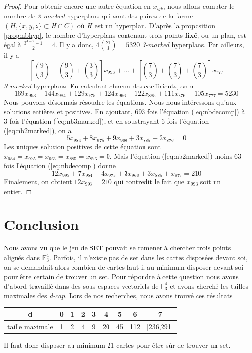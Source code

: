 \documentclass[a4paper,12pt,titlepage]{article}
\theoremstyle{plain}
\newcommand{\Ftrois}[1]{\mathbb{F}^#1_3}
\theoremstyle{definition}
\begin{document}
\begin{proof}
Pour obtenir encore une autre équation en $x_{ijk}$, nous allons compter le nombre de \emph{3-marked} hyperplans qui sont des paires de la forme $(H,\{x,y,z\} \subset H \cap C)$ où $H$ est un hyperplan. D'après la proposition \ref{prop:nbhyp}, le nombre d'hyperplans contenant trois points \textbf{fixé}, ou un plan, est égal à $\frac{3^{4-2}-1}{2} = 4$. Il y a donc, $4 \binom{21}{3} = 5320$ \emph{3-marked} hyperplans. Par ailleurs, il y a 
\[
\left[\binom{9}{3}+\binom{9}{3}+\binom{3}{3}\right]x_{993} + \dots + \left[\binom{7}{3}+\binom{7}{3}+\binom{7}{3}\right]x_{777}
\]
\emph{3-marked} hyperplans. En calculant chacun des coefficients, on a
\begin{equation} \label{eq:nb3marked}
169x_{993} + 144x_{984} + 129x_{975} + 124x_{966} + 122x_{885} + 111x_{876} + 105x_{777} = 5230
\end{equation}
Nous pouvons désormais résoudre les équations. Nous nous intéressons qu'aux solutions entières et positives. En ajoutant, 693 fois l'équation (\ref{eq:nbdecomp}) à 3 fois l'équation (\ref{eq:nb3marked}), et en soustrayant 6 fois l'équation (\ref{eq:nb2marked}), on a
\[
5x_{984} + 8x_{975} + 9x_{966} + 3x_{885} + 2x_{876} = 0
\]
Les uniques solution positives de cette équation sont $x_{984} = x_{975} = x_{966} = x_{885} = x_{876} = 0$. Mais l'équation (\ref{eq:nb2marked}) moins 63 fois l'équation (\ref{eq:nbdecomp}) donne
\[
12x_{993} + 7x_{984} + 4x_{975} + 3x_{966} + 3x_{885} + x_{876} = 210
\]
Finalement, on obtient $12x_{993} = 210$ qui contredit le fait que $x_{993}$ soit un entier.
\end{proof}

\section{Conclusion}
Nous avons vu que le jeu de SET pouvait se ramener à chercher trois points alignés dans $\Ftrois{4}$.
Parfois, il n'existe pas de set dans les cartes disposées devant soi, on se demandait alors combien de cartes faut il au minimum disposer devant soi pour être certain de trouver un set.
Pour répondre à cette question nous avons d'abord travaillé dans des sous-espaces vectoriels de $\Ftrois{4}$
et avons cherché les tailles maximales des \emph{d-cap}. Lors de nos recherches, nous avons trouvé ces résultats

\begin{center}
\begin{tabular}{ c | c c c c c c c c }
d & 0 & 1 & 2 & 3 & 4 & 5 & 6 & 7\\
\hline
taille maximale & 1 & 2 & 4 & 9 & 20 & 45 & 112 & [236,291] \\
\end{tabular}
\end{center}

Il faut donc disposer au minimum 21 cartes pour être sûr de trouver un set.




\end{document}
